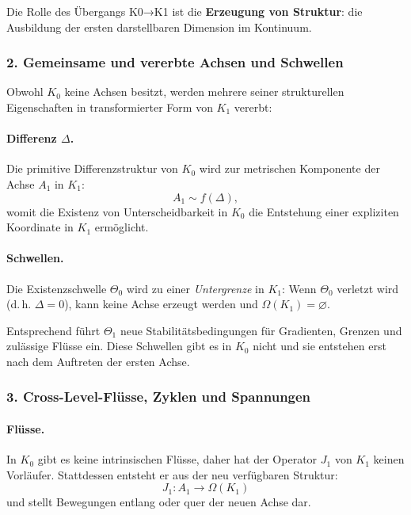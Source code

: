 Die Rolle des Übergangs K0→K1 ist die \textbf{Erzeugung von Struktur}:
die Ausbildung der ersten darstellbaren Dimension im Kontinuum.

\subsubsection{2. Gemeinsame und vererbte Achsen und Schwellen}

Obwohl $K_0$ keine Achsen besitzt, werden mehrere seiner strukturellen
Eigenschaften in transformierter Form von $K_1$ vererbt:

\paragraph{Differenz \texorpdfstring{$\Delta$}{\Delta}.}
Die primitive Differenzstruktur von $K_0$ wird zur metrischen Komponente der
Achse $A_1$ in $K_1$:
\[
A_1 \sim f(\Delta),
\]
womit die Existenz von Unterscheidbarkeit in $K_0$ die Entstehung einer
expliziten Koordinate in $K_1$ ermöglicht.

\paragraph{Schwellen.}
Die Existenzschwelle $\Theta_0$ wird zu einer \emph{Untergrenze} in $K_1$:
Wenn $\Theta_0$ verletzt wird (d.\,h. $\Delta=0$), kann keine Achse erzeugt werden
und $\Omega(K_1)=\varnothing$.

Entsprechend führt $\Theta_1$ neue Stabilitätsbedingungen für Gradienten,
Grenzen und zulässige Flüsse ein. Diese Schwellen gibt es in $K_0$ nicht und sie
entstehen erst nach dem Auftreten der ersten Achse.

\subsubsection{3. Cross-Level-Flüsse, Zyklen und Spannungen}

\paragraph{Flüsse.}
In $K_0$ gibt es keine intrinsischen Flüsse, daher hat der Operator $J_1$ von
$K_1$ keinen Vorläufer. Stattdessen entsteht er aus der neu verfügbaren
Struktur:
\[
J_1 : A_1 \rightarrow \Omega(K_1)
\]
und stellt Bewegungen entlang oder quer der neuen Achse dar.

